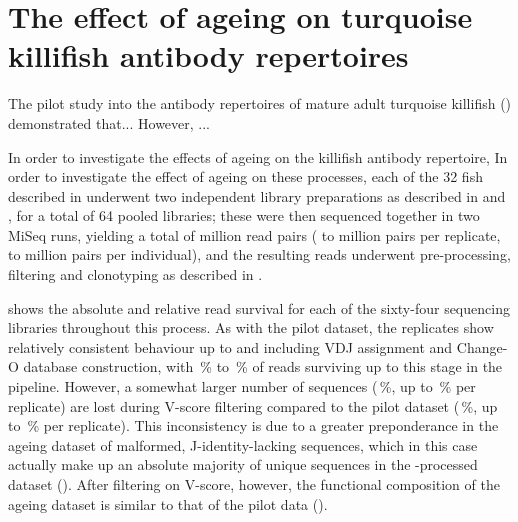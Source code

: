 \section{The effect of ageing on turquoise killifish antibody repertoires}
\label{sec:igseq_ageing}

The pilot study into the antibody repertoires of mature adult turquoise killifish () demonstrated that... %
However, ... %

In order to investigate the effects of ageing on the killifish antibody repertoire, In order to investigate the effect of ageing on these processes, each of the 32 fish described in   %
underwent two independent library preparations as described in  and , %
for a total of 64 pooled libraries; these were then sequenced together in two MiSeq runs, yielding a total of  million read pairs ( to  million pairs per replicate,  to  million pairs per individual), and the resulting reads underwent pre-processing, filtering and clonotyping as described in .

 shows the absolute and relative read survival for each of the sixty-four sequencing libraries throughout this process. As with the pilot dataset, the replicates show relatively consistent behaviour up to and including VDJ assignment and Change-O database construction, with \,\% to \,\% of reads surviving up to this stage in the pipeline. However, a somewhat larger number of sequences (\,\%, up to \,\% per replicate) are lost during V-score filtering compared to the pilot dataset (\,\%, up to \,\% per replicate). This inconsistency is due to a greater preponderance in the ageing dataset of malformed, J-identity-lacking sequences, which in this case actually make up an absolute majority of unique sequences in the -processed dataset (). After filtering on V-score, however, the functional composition of the ageing dataset is similar to that of the pilot data ().

